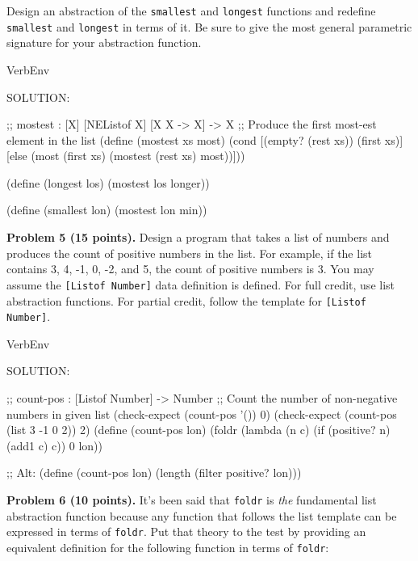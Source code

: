 \documentclass[12pt]{article}
\begin{document}
Design an abstraction of the {\tt smallest} and {\tt longest}
functions and redefine {\tt smallest} and {\tt longest} in terms of
it.  Be sure to give the most general parametric signature for your
abstraction function.


\newpage


\begin{SaveVerbatim}{VerbEnv}

SOLUTION:

;; mostest : [X] [NEListof X] [X X -> X] -> X
;; Produce the first most-est element in the list
(define (mostest xs most)
  (cond [(empty? (rest xs)) (first xs)]
        [else
          (most (first xs)
                (mostest (rest xs) most))]))

(define (longest los)
  (mostest los longer))

(define (smallest lon)
  (mostest lon min))
\end{SaveVerbatim}




\newpage
\noindent
{\bf Problem 5 (15 points).}  
%
Design a program that takes a list of numbers and produces the count
of positive numbers in the list.  For example, if the list contains 3,
4, -1, 0, -2, and 5, the count of positive numbers is 3.  You may
assume the {\tt{[Listof Number]}} data definition is defined.
%
For full credit, use list abstraction functions.  For partial credit,
follow the template for {\tt{[Listof Number]}}.


\begin{SaveVerbatim}{VerbEnv}

SOLUTION:

;; count-pos : [Listof Number] -> Number
;; Count the number of non-negative numbers in given list
(check-expect (count-pos '()) 0)
(check-expect (count-pos (list 3 -1 0 2)) 2)
(define (count-pos lon)
  (foldr (lambda (n c) (if (positive? n) (add1 c) c)) 0 lon))

;; Alt:
(define (count-pos lon)
  (length (filter positive? lon)))
\end{SaveVerbatim}




\newpage

\noindent
{\bf Problem 6 (10 points).}
%
It's been said that {\tt foldr} is \emph{the} fundamental list
abstraction function because any function that follows the list
template can be expressed in terms of {\tt foldr}.  Put that theory to
the test by providing an equivalent definition for the following
function in terms of {\tt foldr}:
\end{document}
